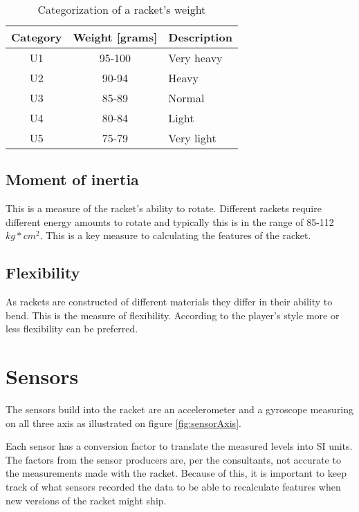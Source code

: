 \begin{table}
	\begin{center}
		\begin{tabularx}{0.7\textwidth}{C|C|L}
			\textbf{Category} & \textbf{Weight [grams]} & \textbf{Description} \\
			\hline
			U1                & 95-100                  & Very heavy           \\
			U2                & 90-94                   & Heavy                \\
			U3                & 85-89                   & Normal               \\
			U4                & 80-84                   & Light                \\
			U5                & 75-79                   & Very light           \\
		\end{tabularx}
	\end{center}
    \caption{Categorization of a racket's weight}
    \label{tab:racket:weight}
\end{table}

\subsection*{Moment of inertia}
This is a measure of the racket's ability to rotate. 
Different rackets require different energy amounts to rotate and typically this is in the range of 85-112 \(kg*cm^2\).
This is a key measure to calculating the features of the racket.

\subsection*{Flexibility}
As rackets are constructed of different materials they differ in their ability to bend. 
This is the measure of flexibility. 
According to the player's style more or less flexibility can be preferred.

\section{Sensors}
The sensors build into the racket are an accelerometer and a gyroscope measuring on all three axis as illustrated on figure \ref{fig:sensorAxis}.

Each sensor has a conversion factor to translate the measured levels into SI units.
The factors from the sensor producers are, per the consultants, not accurate to the measurements made with the racket.
Because of this, it is important to keep track of what sensors recorded the data to be able to recalculate features when new versions of the racket might ship.

